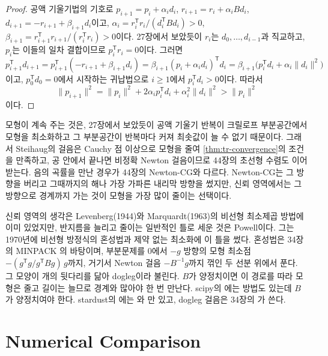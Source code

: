 \begin{proof}
공액 기울기법의 기호로 $p_{i+1}=p_i+\alpha_id_i$, $r_{i+1}=r_i+\alpha_iBd_i$, $d_{i+1}=-r_{i+1}+\beta_{i+1}d_i$이고, $\alpha_i=r_i^{\mathsf T}r_i/(d_i^{\mathsf T}Bd_i)>0$, $\beta_{i+1}=r_{i+1}^{\mathsf T}r_{i+1}/(r_i^{\mathsf T}r_i)>0$이다. 27장에서 보았듯이 $r_i$는 $d_0,\dots,d_{i-1}$과 직교하고, $p_i$는 이들의 일차 결합이므로 $p_i^{\mathsf T}r_i=0$이다. 그러면
\[
p_{i+1}^{\mathsf T}d_{i+1}=p_{i+1}^{\mathsf T}(-r_{i+1}+\beta_{i+1}d_i)=\beta_{i+1}(p_i+\alpha_id_i)^{\mathsf T}d_i=\beta_{i+1}\bigl(p_i^{\mathsf T}d_i+\alpha_i\|d_i\|^2\bigr)
\]
이고, $p_0^{\mathsf T}d_0=0$에서 시작하는 귀납법으로 $i\ge1$에서 $p_i^{\mathsf T}d_i>0$이다. 따라서
\[
\|p_{i+1}\|^2=\|p_i\|^2+2\alpha_ip_i^{\mathsf T}d_i+\alpha_i^2\|d_i\|^2>\|p_i\|^2
\]
이다.
\end{proof}

모형이 계속 주는 것은, 27장에서 보았듯이 공액 기울기 반복이 크릴로프 부분공간에서 모형을 최소화하고 그 부분공간이 반복마다 커져 최솟값이 늘 수 없기 때문이다. 그래서 Steihaug의 걸음은 Cauchy 점 이상으로 모형을 줄여 \cref{thm:tr-convergence}의 조건을 만족하고, 공 안에서 끝나면 비정확 Newton 걸음이므로 44장의 초선형 수렴도 이어받는다. 음의 곡률을 만난 경우가 44장의 Newton-CG와 다르다. Newton-CG는 그 방향을 버리고 그때까지의 해나 가장 가파른 내리막 방향을 썼지만, 신뢰 영역에서는 그 방향으로 경계까지 가는 것이 모형을 가장 많이 줄이는 선택이다.

\begin{aside}
신뢰 영역의 생각은 Levenberg(1944)와 Marquardt(1963)의 비선형 최소제곱 방법\cite{levenberg1944,marquardt1963}에 이미 있었지만, 반지름을 늘리고 줄이는 일반적인 틀로 세운 것은 Powell이다. 그는 1970년에 비선형 방정식의 혼성법\cite{powell1970hybrid}과 제약 없는 최소화에 이 틀을 썼다. 혼성법은 34장의 MINPACK 의 바탕이며, 부분문제를 $0$에서 $-g$ 방향의 모형 최소점 $-(g^{\mathsf T}g/g^{\mathsf T}Bg)\,g$까지, 거기서 Newton 걸음 $-B^{-1}g$까지 꺾인 두 선분 위에서 푼다. 그 모양이 개의 뒷다리를 닮아 dogleg이라 불린다. $B$가 양정치이면 이 경로를 따라 모형은 줄고 길이는 늘므로 경계와 많아야 한 번 만난다. scipy의 에는  방법도 있는데 $B$가 양정치여야 한다. stardust의 에는 와 만 있고, dogleg 걸음은 34장의 가 쓴다.
\end{aside}

\section{Numerical Comparison}
\label{sec:tr-numerics}

